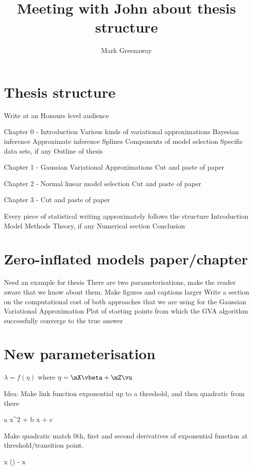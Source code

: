 \documentclass{amsart}
\begin{document}
\title{Meeting with John about thesis structure}
\author{Mark Greenaway}

\section{Thesis structure}
Write at an Honours level audience

Chapter 0 - Introduction
Various kinds of variational approximations
Bayesian inference
Approximate inference
Splines
Components of model selection
Specific data sets, if any
Outline of thesis

Chapter 1 - Gaussian Variational Approximations
Cut and paste of paper

Chapter 2 - Normal linear model selection
Cut and paste of paper

Chapter 3 - 
Cut and paste of paper

Every piece of statistical writing approximately follows the structure
Introduction
Model
Methods
Theory, if any
Numerical section
Conclusion

\section{Zero-inflated models paper/chapter}
Need an example for thesis
There are two parameterisations, make the reader aware that we know about them.
Make figures and captions larger
Write a section on the computational cost of both approaches that we are using for the Gaussian Variational
Approximation
Plot of starting points from which the GVA algorithm successfully converge to the true answer

\section{New parameterisation}
$\lambda = f(\eta)$
where $\eta = \mX \vbeta + \mZ \vu$

Idea: Make link function exponential up to a threshold, and then quadratic from there

a x^2 + b x + c

Make quadratic match 0th, first and second derivatives of exponential function at threshold/transition point.


x \log(\lambda) - \lambda x
\end{document}
